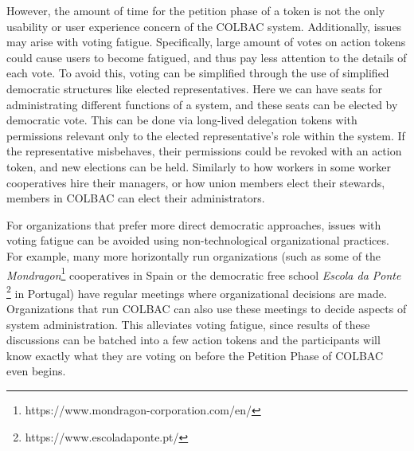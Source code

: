 
However, the amount of time for the petition phase of a token is not the only
usability or user experience concern of the COLBAC system. Additionally, issues
may arise with voting fatigue. Specifically, large amount of votes on action
tokens could cause users to become fatigued, and thus pay less attention to the
details of each vote. To avoid this, voting can be simplified through the use of
simplified democratic structures like elected representatives. Here we can have
seats for administrating different functions of a system, and these seats can be
elected by democratic vote. This can be done via long-lived delegation tokens
with permissions relevant only to the elected representative's role within the
system. If the representative misbehaves, their permissions could be revoked
with an action token, and new elections can be held. Similarly to how workers in
some worker cooperatives hire their managers, or how union members elect their
stewards, members in COLBAC can elect their administrators.

For organizations that prefer more direct democratic approaches, issues with
voting fatigue can be avoided using non-technological organizational practices.
For example, many more horizontally run organizations (such as some of the 
\textit{Mondragon}\footnote{https://www.mondragon-corporation.com/en/}
cooperatives in Spain or the democratic free school \textit{Escola da Ponte}
\footnote{https://www.escoladaponte.pt/} in Portugal) have regular meetings
where organizational decisions are made. Organizations that run COLBAC can also
use these meetings to decide aspects of system administration. This alleviates
voting fatigue, since results of these discussions can be batched into a few
action tokens and the participants will know exactly what they are voting on
before the Petition Phase of COLBAC even begins.
